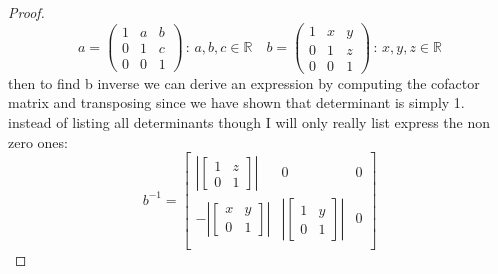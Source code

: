\documentclass[11pt]{article}
\theoremstyle{definition}  %
\newcommand{\R}{\mathbb{R}}
\begin{document}
\begin{proof}
    \[
      a=  \left( \begin{array}{ccc} 1 & a & b \\ 0 & 1 & c  \\ 0 & 0 & 1 \end{array} \right) \, : \,  a, b, c \in \R  \quad b=\left( \begin{array}{ccc} 1 & x & y \\ 0 & 1 & z  \\ 0 & 0 & 1 \end{array} \right) \, : \,  x, y, z \in \R
    \] then to find b inverse we can derive an expression by computing the cofactor matrix and transposing since we have shown that determinant is simply 1.
    instead of listing all determinants though I will only really list express the non zero ones:
    \[
    b^{-1}=
      \begin{bmatrix}
        \left|\begin{bmatrix}
          1&z\\0&1
        \end{bmatrix}\right|&0&0\\

        -\left|\begin{bmatrix}
          x&y\\0&1
        \end{bmatrix}\right|&\left|\begin{bmatrix}
          1&y\\0&1
        \end{bmatrix}\right|&0\\


\end{bmatrix}\]
\end{proof}
\end{document}
